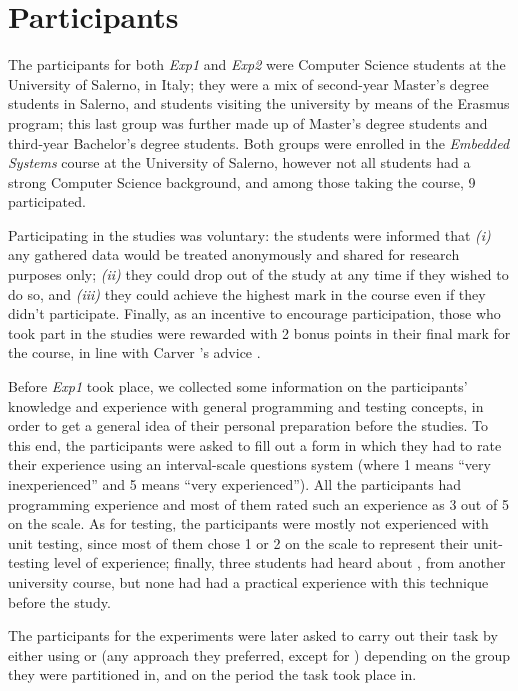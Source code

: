 \section{Participants}
The participants for both \textit{Exp1} and \textit{Exp2} were Computer Science students at the University of Salerno, in Italy; they were a mix of second-year Master's degree students in Salerno, and students visiting the university by means of the Erasmus program; this last group was further made up of Master's degree students and third-year Bachelor's degree students. Both groups were enrolled in the \textit{Embedded Systems} course at the University of Salerno, however not all students had a strong Computer Science background, and among those taking the course, 9 participated. 

Participating in the studies was voluntary: the students were informed that \textit{(i)} any gathered data would be treated anonymously and shared for research purposes only; \textit{(ii)} they could drop out of the study at any time if they wished to do so, and \textit{(iii)} they could achieve the highest mark in the course even if they didn't participate. Finally, as an incentive to encourage participation, those who took part in the studies were rewarded with 2 bonus points in their final mark for the course, in line with Carver \etal's advice \cite{DBLP:conf/metrics/CarverJMS03}.

Before \textit{Exp1} took place, we collected some information on the participants' knowledge and experience with general programming and testing concepts, in order to get a general idea of their personal preparation before the studies. To this end, the participants were asked to fill out a form in which they had to rate their experience using an interval-scale questions system (where 1 means “very inexperienced” and 5 means “very experienced”). All the participants had programming experience and most of them rated such an experience as 3 out of 5 on the scale. 
As for testing, the participants were mostly not experienced with unit testing, since most of them chose 1 or 2 on the scale to represent their unit-testing level of experience; finally, three students had heard about \tdd, from another university course, but none had had a practical experience with this technique before the study.

The participants for the experiments were later asked to carry out their task by either using \tdd or \notdd (\ie any approach they preferred, except for \tdd) depending on the group they were partitioned in, and on the period the task took place in. 





